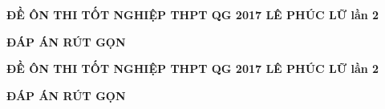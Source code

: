 \documentclass[11pt]{article}
\def\lamtieude{
\begin{center}\large\bf ĐỀ ÔN THI TỐT NGHIỆP THPT QG 2017 LÊ PHÚC LỮ lần 2\end{center}
}
\begin{document}
\setlength{\baselineskip}{12truept}
\def\v#1{\overrightarrow{#1}} %

\indebai
\lamtieude
\begin{multicols}{2}
\begin{enumerate}[]
\foreachproblem[bttracnghiem]{\item\causo\thisproblem}
\end{enumerate}
\end{multicols}
\label{dbPage}
\setlength{\columnsep}{0pt}
\setlength{\columnseprule}{0pt}
\indapanso
\begin{center}
{\bf ĐÁP ÁN RÚT GỌN}
\end{center}
\begin{center}
\begin{minipage}[t]{19cm}
\begin{multicols}{10}
\begin{enumerate}[\socau]
\foreachproblem[bttracnghiem]{\item\thisproblem}
\end{enumerate}
\end{multicols}
\end{minipage}
\end{center}
\setlength{\columnsep}{10pt}
\setlength{\columnseprule}{0.5pt}
\newpage
\setcounter{page}{1}
\indebaidapan
\lamtieude
\begin{multicols}{2}
\begin{enumerate}[]
\foreachproblem[bttracnghiem]{\item\causo\thisproblem}
\end{enumerate}
\end{multicols}
\setlength{\columnsep}{0pt}
\setlength{\columnseprule}{0pt}
\indapanso
\begin{center}
{\bf ĐÁP ÁN RÚT GỌN}
\end{center}
\begin{center}
\begin{minipage}[t]{19cm}
\begin{multicols}{10}
\begin{enumerate}[\socau]
\foreachproblem[bttracnghiem]{\item\thisproblem}
\end{enumerate}
\end{multicols}
\end{minipage}
\end{center}
\setlength{\columnsep}{10pt}
\setlength{\columnseprule}{0.5pt}
\end{document}
